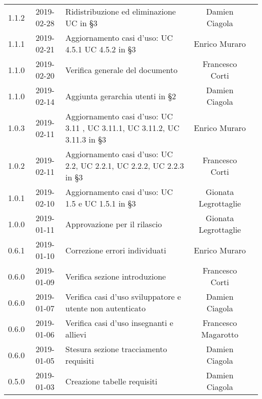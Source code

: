 {\begin{longtable}{ c c C{6cm} c c }
		1.1.2 &
		2019-02-28 &
		Ridistribuzione ed eliminazione UC in §3 &
		Damien Ciagola&
		\reda{} \\	
		
		
		1.1.1 &
		2019-02-21 &
		Aggiornamento casi d'uso: UC 4.5.1 UC 4.5.2 in §3 &
		Enrico Muraro&
		\reda{} \\		
				
		1.1.0 &
		2019-02-20 &
		Verifica generale del documento&
		Francesco Corti&
		\reda{} \\		
				
		1.1.0 &
		2019-02-14 &
		Aggiunta gerarchia utenti in §2 &
		Damien Ciagola&
		\reda{} \\
		
		1.0.3 &
		2019-02-11 &
		Aggiornamento casi d'uso: UC 3.11 , UC 3.11.1, UC 3.11.2, UC 3.11.3 in §3 &
		Enrico Muraro&
		\reda{} \\
		
		1.0.2 &
		2019-02-11 &
		Aggiornamento casi d'uso: UC 2.2, UC 2.2.1, UC 2.2.2, UC 2.2.3 in §3 &
		Francesco Corti&
		\reda{} \\

		1.0.1 &
		2019-02-10 &
		Aggiornamento casi d'uso: UC 1.5 e UC 1.5.1 in §3 &
		Gionata Legrottaglie&
		\reda{} \\

		1.0.0 &
		2019-01-11 &
		Approvazione per il rilascio &	
		Gionata Legrottaglie&	
		\Res{} \\
		
		0.6.1 & 
		2019-01-10 &  
		Correzione errori individuati &	
		Enrico Muraro&	
		\reda{} \\
		
		0.6.0 & 
		2019-01-09 &  
		Verifica sezione introduzione &	
		Francesco Corti&	
		\ver{} \\
		
		0.6.0 & 
		2019-01-07 &  
		Verifica casi d'uso sviluppatore e utente non autenticato& 	
		Damien Ciagola  &	
		\ver{} \\
		
		0.6.0 & 
		2019-01-06 &  
		Verifica casi d'uso insegnanti e allievi & 
		Francesco Magarotto  &
		\ver{}  \\
		
		0.6.0 & 
		2019-01-05 &  
		Stesura sezione tracciamento requisiti &	
		Damien Ciagola &	
		\reda{} \\
		
		0.5.0 & 
		2019-01-03 &  
		Creazione tabelle requisiti&	
		Damien Ciagola &	
		\reda{} \\
		

\end{longtable}}
